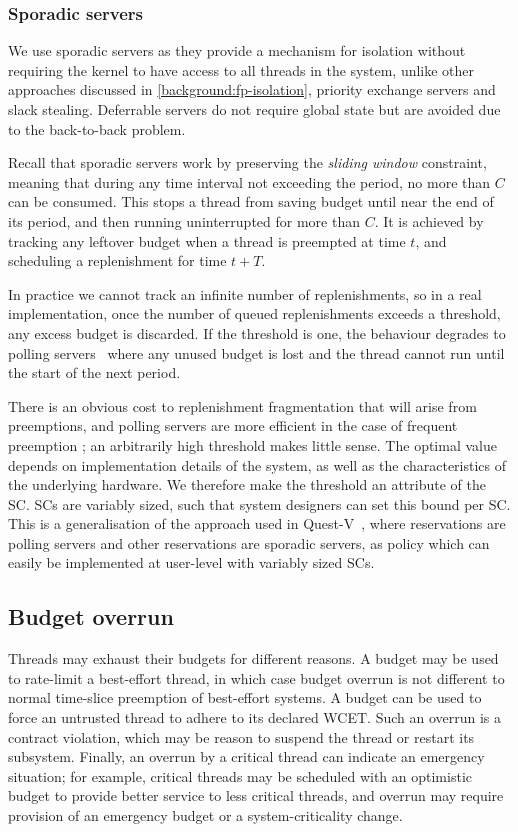 \subsubsection{Sporadic servers}
\label{s:sporadic}
We use sporadic servers as they provide a mechanism for isolation without requiring the kernel
to have access to all threads in the system, unlike other approaches discussed in
\cref{background:fp-isolation}, \eg  priority exchange servers and slack stealing.
Deferrable servers do not require global state but are avoided due to the back-to-back
problem. 

Recall that sporadic servers work by preserving the
\emph{sliding window} constraint, meaning that during any time
interval not exceeding the period, no more than $C$ can be consumed.
This stops a thread from saving budget until near the end of its
period, and then running uninterrupted for more than $C$. It is achieved by tracking any leftover
budget when
a thread is preempted at time \(t\), and scheduling a replenishment for time  $t+T$.

In practice we cannot track an infinite number of
replenishments, so in a real implementation, once the number of
queued replenishments exceeds a threshold, any excess budget is
discarded. If the threshold is one, the behaviour degrades to polling
servers~\citep{Sprunt_SL_89a} where any unused budget is lost and the
thread cannot run until the start of the next period.

There is an obvious cost to replenishment fragmentation that will
arise from preemptions, and polling servers are more efficient in the
case of frequent preemption \citep{Li_WCM_14}; an arbitrarily high
threshold makes little sense. The optimal value depends on
implementation details of the system, as well as the characteristics
of the underlying hardware.
We therefore make the threshold an attribute of the SC. \glspl{SC} are variably sized,
such that system designers can set this bound per SC. This is a generalisation of the approach used
in Quest-V~\citep{Danish_LW_11}, where \IO reservations are polling servers and other reservations 
are sporadic servers, as policy which can easily be implemented at user-level with variably sized
\glspl{SC}.

\subsection{Budget overrun}\label{s:timeout}

Threads may exhaust their budgets for different reasons. A budget may
be used to rate-limit a best-effort thread, in which case budget
overrun is not different to normal time-slice preemption of
best-effort systems. A budget can be used to force an untrusted thread
to adhere to its declared WCET. Such an overrun is a contract violation, which may be reason
to suspend the thread or restart its subsystem. Finally, an overrun by
a critical thread can indicate an emergency situation; for example,
critical threads may be scheduled with an optimistic budget to provide
better service to less critical threads, and overrun may require
provision of an emergency budget or a system-criticality change.

